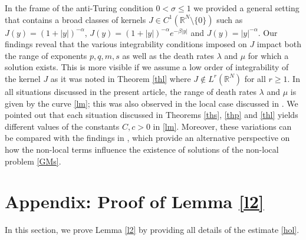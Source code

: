 \documentclass[leqno,12pt]{article}
\newcommand{\R}{\mathbb R}
\numberwithin{equation}{section}
\begin{document}
In the frame of the anti-Turing condition $0<\sigma\leq 1$ we provided a general setting that contains a broad classes of kernels $J\in C^1(\R^N\setminus\{0\})$ such as  
 $J(y)=(1+|y|)^{-\alpha}$, $J(y)=(1+|y|)^{-\alpha}e^{-\beta|y|}$ and $J(y)=|y|^{-\alpha}$. Our findings reveal that the various integrability conditions imposed on $J$ impact both the range of exponents $p,q,m, s$ as well as the death rates $\lambda$ and $\mu$ for which a solution exists. This is more visible if we assume a low order of integrability of the kernel $J$ as it was noted in Theorem \ref{thl} where $J\not\in L^r(\R^N)$ for all $r\geq 1$. In all situations discussed in the present article, the range of death rates $\lambda$ and $\mu$ is given by the curve \eqref{lm}; this  was also observed in the local case discussed in \cite{G23}. We pointed out that each situation discussed in Theorems \ref{ths}, \ref{thp} and \ref{thl} yields different values of the constants $C, c>0$ in \eqref{lm}. Moreover, these variations can be compared with the findings in \cite{G23}, which provide an alternative perspective on how the non-local terms influence the existence of solutions of the non-local problem \eqref{GMs}.



 
\section*{Appendix: Proof of Lemma \ref{l2}}

In this section, we prove Lemma \ref{l2} by providing all details of the estimate \eqref{hol}.
\end{document}
